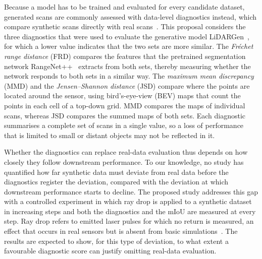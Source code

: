 Because a model has to be trained and evaluated for every candidate dataset, generated scans are commonly assessed with data-level diagnostics instead, which compare synthetic scans directly with real scans~\cite{zyrianovLearningGenerateRealistic2022}. This proposal considers the three diagnostics that were used to evaluate the generative model LiDARGen~\cite{zyrianovLearningGenerateRealistic2022}, for which a lower value indicates that the two sets are more similar. The \emph{Fr\'echet range distance} (FRD) compares the features that the pretrained segmentation network RangeNet++~\cite{miliotoRangeNet++Fast2019} extracts from both sets, thereby measuring whether the network responds to both sets in a similar way. The \emph{maximum mean discrepancy} (MMD) and the \emph{Jensen--Shannon distance} (JSD) compare where the points are located around the sensor, using bird's-eye-view (BEV) maps that count the points in each cell of a top-down grid. MMD compares the maps of individual scans, whereas JSD compares the summed maps of both sets. Each diagnostic summarises a complete set of scans in a single value, so a loss of performance that is limited to small or distant objects may not be reflected in it.

Whether the diagnostics can replace real-data evaluation thus depends on how closely they follow downstream performance. To our knowledge, no study has quantified how far synthetic data must deviate from real data before the diagnostics register the deviation, compared with the deviation at which downstream performance starts to decline. The proposed study addresses this gap with a controlled experiment in which ray drop is applied to a synthetic dataset in increasing steps and both the diagnostics and the mIoU are measured at every step. Ray drop refers to emitted laser pulses for which no return is measured, an effect that occurs in real sensors but is absent from basic simulations~\cite{manivasagamLiDARsimRealisticLiDAR2020}. The results are expected to show, for this type of deviation, to what extent a favourable diagnostic score can justify omitting real-data evaluation.